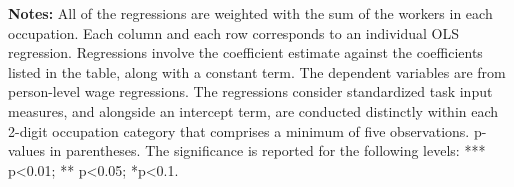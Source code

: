 \begin{table}[H]
\caption{\label{tab:Coefficients of bivaraite regressions}Relationship Between
the Coefficients Obtained from the Wage Function of Each Occupation}

\begin{centering}
\noindent{}
\par\end{centering}
\medskip

\textbf{Notes:} All of the regressions are weighted with the sum of
the workers in each occupation. Each column and each row corresponds
to an individual OLS regression. Regressions involve the coefficient
estimate against the coefficients listed in the table, along with
a constant term. The dependent variables are from person-level wage
regressions. The regressions consider standardized task input measures,
and alongside an intercept term, are conducted distinctly within each
2-digit occupation category that comprises a minimum of five observations.
p-values in parentheses. The significance is reported for the following
levels: {*}{*}{*} p<0.01; {*}{*} p<0.05; {*}p<0.1.
\end{table}
